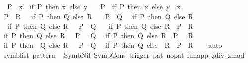 \begin{isabellebody}
\ \ {\isachardoublequoteopen}{\isasymnot}\ P\ {\isasymor}\ x\ {\isacharequal}{\kern0pt}\ {\isacharparenleft}{\kern0pt}if\ P\ then\ x\ else\ y{\isacharparenright}{\kern0pt}{\isachardoublequoteclose}\isanewline
\ \ {\isachardoublequoteopen}{\isasymnot}\ P\ {\isasymor}\ {\isacharparenleft}{\kern0pt}if\ P\ then\ x\ else\ y{\isacharparenright}{\kern0pt}\ {\isacharequal}{\kern0pt}\ x{\isachardoublequoteclose}\isanewline
\ \ {\isachardoublequoteopen}P\ {\isasymor}\ R\ {\isasymor}\ {\isasymnot}\ {\isacharparenleft}{\kern0pt}if\ P\ then\ Q\ else\ R{\isacharparenright}{\kern0pt}{\isachardoublequoteclose}\isanewline
\ \ {\isachardoublequoteopen}{\isasymnot}\ P\ {\isasymor}\ Q\ {\isasymor}\ {\isasymnot}\ {\isacharparenleft}{\kern0pt}if\ P\ then\ Q\ else\ R{\isacharparenright}{\kern0pt}{\isachardoublequoteclose}\isanewline
\ \ {\isachardoublequoteopen}{\isasymnot}\ {\isacharparenleft}{\kern0pt}if\ P\ then\ Q\ else\ R{\isacharparenright}{\kern0pt}\ {\isasymor}\ {\isasymnot}\ P\ {\isasymor}\ Q{\isachardoublequoteclose}\isanewline
\ \ {\isachardoublequoteopen}{\isasymnot}\ {\isacharparenleft}{\kern0pt}if\ P\ then\ Q\ else\ R{\isacharparenright}{\kern0pt}\ {\isasymor}\ P\ {\isasymor}\ R{\isachardoublequoteclose}\isanewline
\ \ {\isachardoublequoteopen}{\isacharparenleft}{\kern0pt}if\ P\ then\ Q\ else\ R{\isacharparenright}{\kern0pt}\ {\isasymor}\ {\isasymnot}\ P\ {\isasymor}\ {\isasymnot}\ Q{\isachardoublequoteclose}\isanewline
\ \ {\isachardoublequoteopen}{\isacharparenleft}{\kern0pt}if\ P\ then\ Q\ else\ R{\isacharparenright}{\kern0pt}\ {\isasymor}\ P\ {\isasymor}\ {\isasymnot}\ R{\isachardoublequoteclose}\isanewline
\ \ {\isachardoublequoteopen}{\isacharparenleft}{\kern0pt}if\ P\ then\ {\isasymnot}\ Q\ else\ R{\isacharparenright}{\kern0pt}\ {\isasymor}\ {\isasymnot}\ P\ {\isasymor}\ Q{\isachardoublequoteclose}\isanewline
\ \ {\isachardoublequoteopen}{\isacharparenleft}{\kern0pt}if\ P\ then\ Q\ else\ {\isasymnot}\ R{\isacharparenright}{\kern0pt}\ {\isasymor}\ P\ {\isasymor}\ R{\isachardoublequoteclose}\isanewline
%
\isadelimproof
\ \ %
\endisadelimproof
%
\isatagproof
{}\isamarkupfalse%
\ auto%
\endisatagproof
{\isafoldproof}%
%
\isadelimproof
\isanewline
%
\endisadelimproof
\isanewline
{}\isamarkupfalse%
\ {\isacharparenleft}{\kern0pt}\ symb{\isacharunderscore}{\kern0pt}list\ pattern\isanewline
{}\isamarkupfalse%
\ {\isacharparenleft}{\kern0pt}\ Symb{\isacharunderscore}{\kern0pt}Nil\ Symb{\isacharunderscore}{\kern0pt}Cons\ trigger\ pat\ nopat\ fun{\isacharunderscore}{\kern0pt}app\ z{}div\ z{}mod\isanewline
%
\isadelimtheory
\isanewline
%
\endisadelimtheory
%
\isatagtheory
{}\isamarkupfalse%
%
\endisatagtheory
{\isafoldtheory}%
%
\isadelimtheory
%
\endisadelimtheory
%
\end{isabellebody}%
